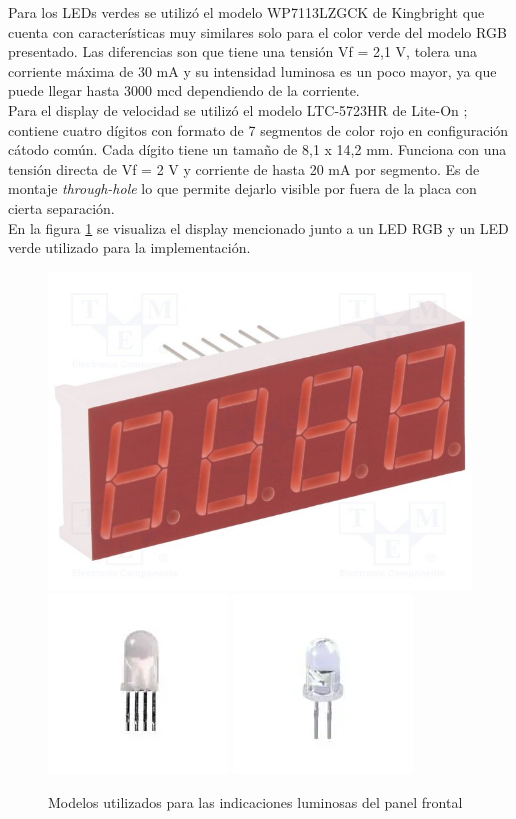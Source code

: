 Para los LEDs verdes se utilizó el modelo WP7113LZGCK de Kingbright \cite{WP7113LZGCK} que cuenta con características muy similares solo para el color verde del modelo RGB presentado. Las diferencias son que tiene una tensión Vf = 2,1 V, tolera una corriente máxima de 30 mA y su intensidad luminosa es un poco mayor, ya que puede llegar hasta 3000 mcd dependiendo de la corriente. \\ 

Para el display de velocidad se utilizó el modelo LTC-5723HR de Lite-On \cite{LTC-5723HR}; contiene cuatro dígitos con formato de 7 segmentos de color rojo en configuración cátodo común. Cada dígito tiene un tamaño de 8,1 x 14,2 mm. Funciona con una tensión directa de Vf = 2 V y corriente de hasta 20 mA por segmento. Es de montaje \textit{through-hole} lo que permite dejarlo visible por fuera de la placa con cierta separación. \\

En la figura \ref{fig:leds_model} se visualiza el display mencionado junto a un LED RGB y un LED verde utilizado para la implementación. 

\begin{figure}[H]
    \centering
    \includegraphics[width = 0.3 \linewidth]{img/display.jpg}
    \includegraphics[width = 0.3 \linewidth]{img/led_rgb.png}
    \includegraphics[width = 0.3 \linewidth]{img/led_g.png}
    \caption{Modelos utilizados para las indicaciones luminosas del panel frontal}
    \label{fig:leds_model}
\end{figure}    


